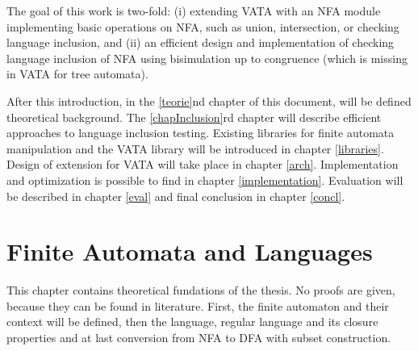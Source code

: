 The goal of this work is two-fold: (i) extending VATA with an NFA module implementing basic operations on NFA, such as union, intersection, or 
checking language inclusion, and (ii) an efficient design and implementation of checking language inclusion of NFA using 
bisimulation up to congruence (which is missing in VATA for tree automata).

After this introduction, in the \ref{teorie}nd chapter of this document, 
will be defined theoretical background. The \ref{chapInclusion}rd chapter will describe efficient approaches to language inclusion testing.
Existing libraries for finite automata manipulation and the VATA library will be introduced in chapter \ref{libraries}. 
Design of extension for VATA 
will take place in chapter \ref{arch}. Implementation and optimization is possible to find in chapter \ref{implementation}. Evaluation will be
described in chapter \ref{eval} and final conclusion in chapter \ref{concl}.
\chapter{Finite Automata and Languages}
This chapter contains theoretical fundations of the thesis. No proofs are given, because they can be found in literature. 
First, the finite automaton and their context will be defined, then the language, regular language and its closure properties and at last conversion from
NFA to DFA with subset construction. 
\label{teorie}

